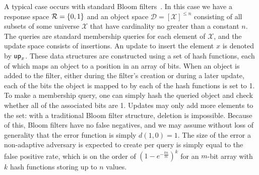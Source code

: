 

A typical case occurs with standard Bloom filters~\cite{bloomfilter}. In this case we have a response space $\mathcal{R} = \{0,1\}$ and an object space $\mathcal{D} = [\mathcal{X}]^{\le n}$ consisting of all subsets of some universe $\mathcal{X}$ that have cardinality no greater than a constant $n$. The queries are standard membership queries for each element of $\mathcal{X}$, and the update space consists of insertions. An update to insert the element $x$ is denoted by $\mathsf{up}_x$. These data structures are constructed using a set of hash functions, each of which maps an object to a position in an array of bits. When an object is added to the filter, either during the filter's creation or during a later update, each of the bits the object is mapped to by each of the hash functions is set to 1. To make a membership query, one can simply hash the queried object and check whether all of the associated bits are 1. Updates may only add more elements to the set: with a traditional Bloom filter structure, deletion is impossible. Because of this, Bloom filters have no false negatives, and we may assume without loss of generality that the error function is simply $d(1,0) = 1$. The size of the error a non-adaptive adversary is expected to create per query is simply equal to the false positive rate, which is on the order of $(1-e^{-\frac{kn}{m}})^k$ for an $m$-bit array with $k$ hash functions storing up to $n$ values.


